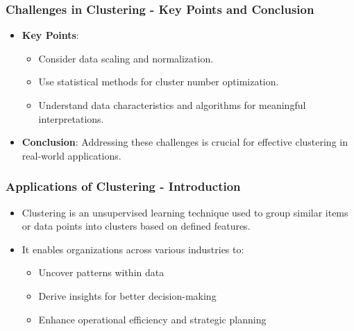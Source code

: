 \documentclass[aspectratio=169]{beamer}
\begin{document}
\begin{frame}[fragile]
    \frametitle{Challenges in Clustering - Key Points and Conclusion}
    \begin{itemize}
        \item \textbf{Key Points}:
            \begin{itemize}
                \item Consider data scaling and normalization.
                \item Use statistical methods for cluster number optimization.
                \item Understand data characteristics and algorithms for meaningful interpretations.
            \end{itemize}
        \item \textbf{Conclusion}: Addressing these challenges is crucial for effective clustering in real-world applications.
    \end{itemize}
\end{frame}

\begin{frame}[fragile]
    \frametitle{Applications of Clustering - Introduction}
    \begin{itemize}
        \item Clustering is an unsupervised learning technique used to group similar items or data points into clusters based on defined features.
        \item It enables organizations across various industries to:
        \begin{itemize}
            \item Uncover patterns within data
            \item Derive insights for better decision-making
            \item Enhance operational efficiency and strategic planning
        \end{itemize}
    \end{itemize}
\end{frame}
\end{document}
